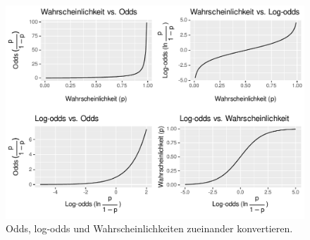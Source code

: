 \documentclass[oneside, 10pt]{book}\usepackage[]{graphicx}\usepackage[]{xcolor}
\newenvironment{knitrout}{}{} %
\begin{document}
\begin{knitrout}
\color{fgcolor}\begin{figure}[tp]

{\centering \includegraphics[width=.8\textwidth]{figs/unnamed-chunk-426-1} 

}

\caption{Odds, log-odds und Wahrscheinlichkeiten zueinander konvertieren.\label{fig:logodds}}\label{fig:unnamed-chunk-426}
\end{figure}

\end{knitrout}
\end{document}
